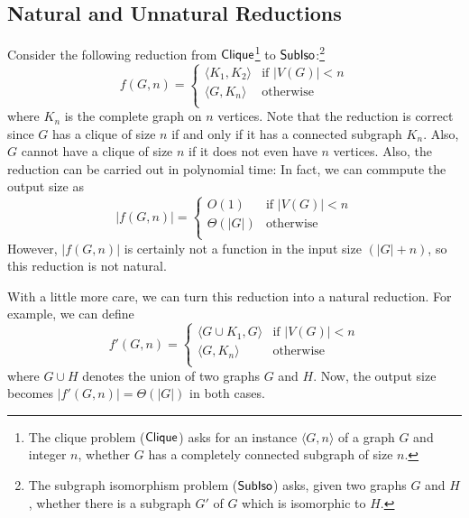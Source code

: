 \documentclass[12pt]{article}
\theoremstyle{definition}
\begin{document}
\subsection{Natural and Unnatural Reductions}
Consider the following reduction from
$\mathsf{Clique}$\footnote{
  The clique problem ($\mathsf{Clique}$) asks for an instance
  $\langle G, n \rangle$ of a graph $G$ and integer $n$, whether $G$ has
  a completely connected subgraph of size $n$.
}
to
$\mathsf{SubIso}$:\footnote{
  The subgraph isomorphism problem ($\mathsf{SubIso}$) asks, given two graphs
  $G$ and $H$, whether there is a subgraph $G'$ of $G$ which is isomorphic to
  $H$.
}
\[
  f(G, n) =
  \left\{
    \begin{array}{ll}
      \langle K_1, K_2 \rangle & \textrm{if } |V(G)| < n \\
      \langle G, K_{n} \rangle & \textrm{otherwise} \\
    \end{array}
  \right.
\]
where $K_n$ is the complete graph on $n$ vertices.
Note that the reduction is correct since $G$ has a clique of size $n$ if and
only if it has a connected subgraph $K_n$. Also, $G$ cannot have a clique of
size $n$ if it does not even have $n$ vertices.
Also, the reduction can be carried out in polynomial time: In fact,
we can commpute the output size as
\[
  |f(G,n)| = 
  \left\{
    \begin{array}{ll}
      O(1) & \textrm{if } |V(G)| < n \\
      \Theta(|G|) & \textrm{otherwise} \\
    \end{array}
  \right.
\]
However, $|f(G,n)|$ is certainly not a function in the input size $(|G|+n)$,
so this reduction is not natural.

With a little more care, we can turn this reduction into a natural reduction.
For example, we can define
\[
  f'(G, n) =
  \left\{
    \begin{array}{ll}
      \langle G \cup K_1, G \rangle & \textrm{if } |V(G)| < n \\
      \langle G, K_{n} \rangle & \textrm{otherwise} \\
    \end{array}
  \right.
\]
where $G \cup H$ denotes the union of two graphs $G$ and $H$.
Now, the output size becomes
$|f'(G,n)| = \Theta(|G|)$
in both cases.
\end{document}
